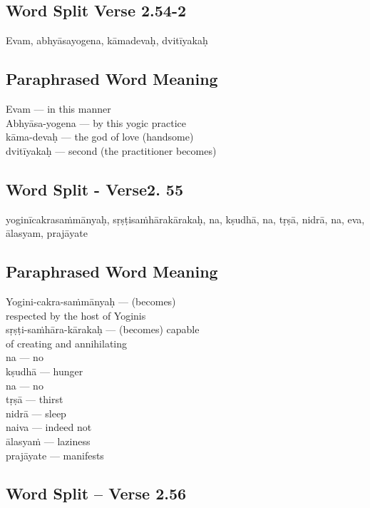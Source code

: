 \subsection*{Word Split Verse 2.54-2}


Evam, abhyāsayogena, kāmadevaḥ, dvitīyakaḥ

\subsection*{Paraphrased Word Meaning}


\begin{multicols}{2}
Evam --- in this manner\\
Abhyāsa-yogena --- by this yogic practice \\
kāma-devaḥ --- the god of love (handsome)\\
dvitīyakaḥ --- second (the practitioner becomes)
\end{multicols}

\subsection*{Word Split - Verse2. 55}


yoginīcakrasaṁmānyaḥ, sṛṣṭisaṁhārakārakaḥ, na, kṣudhā, na, tṛṣā, nidrā, na, eva, ālasyam, prajāyate

\subsection*{Paraphrased Word Meaning}


\begin{multicols}{2}
Yogini-cakra-saṁmānyaḥ --- (becomes)\\
respected by the host of Yoginis \\
sṛṣṭi-saṁhāra-kārakaḥ --- (becomes) capable\\
of creating and annihilating  \\
na --- no \\
kṣudhā --- hunger \\
na --- no\\
tṛṣā --- thirst \\
nidrā --- sleep \\
naiva --- indeed not \\
ālasyaṁ --- laziness \\
prajāyate --- manifests 
\end{multicols}

\subsection*{Word Split -- Verse 2.56}


